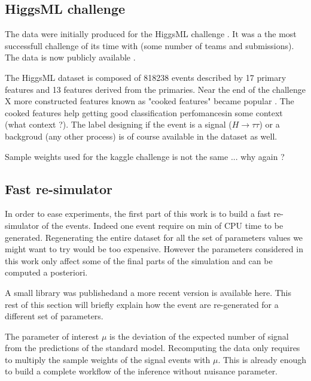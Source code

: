 \subsection{HiggsML challenge} %
\label{sub:higgsml_challenge}


The data were initially produced for the HiggsML challenge \cite{Adam-Bourdarios2014}.
It was a the most successfull challenge of its time with (some number of teams and submissions).
The data is now publicly available \needcite.

The HiggsML dataset is composed of 818238 events described by 17 primary features and 13 features derived from the primaries.
Near the end of the challenge X more constructed features known as "cooked features" became popular \needcite.
The cooked features help getting good classification perfomances\needcite in some context (what context ?).
The label designing if the event is a signal ($H\to \tau \tau$) or a backgroud (any other process) is of course available in the dataset as well.

Sample weights used for the kaggle challenge is not the same ... why again ?







\subsection{Fast re-simulator} %
\label{sub:fast_re_simulator}


In order to ease experiments, the first part of this work is to build a fast re-simulator of the events.
Indeed one event require on min of CPU time to be generated.
Regenerating the entire dataset for all the set of parameters values we might want to try would be too expensive.
However the parameters considered in this work only affect some of the final parts of the simulation and can be computed a posteriori.

A small library was published\needcite and a more recent version is available here\needcite.
This rest of this section will briefly explain how the event are re-generated for a different set of parameters.

The parameter of interest $\mu$ is the deviation of the expected number of signal from the predictions of the standard model.
Recomputing the data only requires to multiply the sample weights of the signal events with $\mu$.
This is already enough to build a complete workflow of the inference without nuisance parameter.

